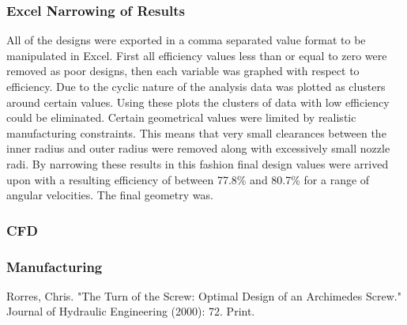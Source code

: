 \documentclass{report}
\begin{document}
\subsubsection{Excel Narrowing of Results}
All of the designs were exported in a comma separated value format to be manipulated in Excel. First all efficiency values less than or equal to zero were removed as poor designs, then each variable was graphed with respect to efficiency. Due to the cyclic nature of the analysis data was plotted as clusters around certain values. Using these plots the clusters of data with low efficiency could be eliminated. Certain geometrical values were limited by realistic manufacturing constraints. This means that very small clearances between the inner radius and outer radius were removed along with  excessively small nozzle radi. By narrowing these results in this fashion final design values were arrived upon with a resulting efficiency of between 77.8\% and 80.7\% for a range of angular velocities. The final geometry was.
\subsubsection{CFD}
\subsubsection{Manufacturing}
\begin{thebibliography}{9}
Rorres, Chris. "The Turn of the Screw: Optimal Design of an Archimedes Screw." Journal of Hydraulic Engineering (2000): 72. Print.
\end{thebibliography}
\end{document}
